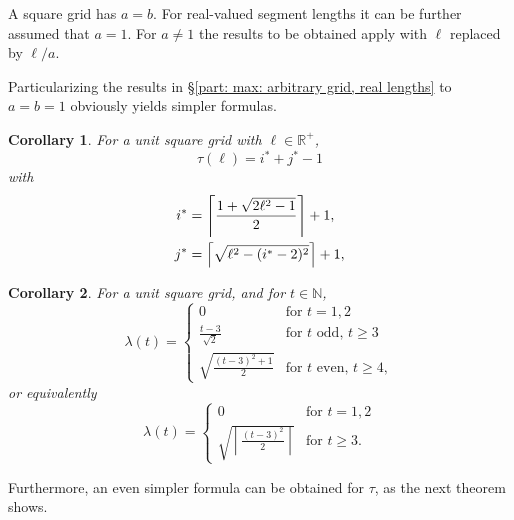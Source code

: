 \documentclass[12pt, a4paper]{article}
\let\Re\relax %
\DeclareMathOperator{\Re}{Re} %
\newcommand{\funt}{\tau} %
\newcommand{\funl}{\lambda} %
\newcommand{\len}{\ell} %
\newcommand{\tiles}{t} %
\newcommand{\isoli}{i^\ast}
\newcommand{\jsoli}{j^\ast}
\newtheorem{corollary}{Corollary}%
\begin{document}
A square grid has $a=b$. For real-valued segment lengths it can be further assumed that $a=1$. For $a \neq 1$ the results to be obtained apply with $\len$ replaced by $\len/a$.

Particularizing the results in \S\ref{part: max: arbitrary grid, real lengths} to $a=b=1$ obviously yields simpler formulas.

\begin{corollary}
\label{cor: funt, sq, form}
For a unit square grid with $\len \in \mathbb R^+$,
\begin{equation}
\label{eq: cor: funt, sq, form}
\funt(\len) = \isoli+\jsoli-1
\end{equation}
with
\begin{align}
\label{eq: cor: funt, sq, form; i}
\isoli &= \left\lceil \frac{1 + \Re \sqrt{2\len^2-1}}{2} \right\rceil + 1, \\
\label{eq: cor: funt, sq, form; j}
\jsoli &= \left\lceil \sqrt{\len^2-(\isoli-2)^2} \right\rceil + 1,
\end{align}
\end{corollary}

\begin{corollary}
\label{theo: funl, sq, form}
For a unit square grid, and for $\tiles \in \mathbb N$,
\begin{equation}
\funl(\tiles) = \begin{cases}
\displaystyle
0 & \text{for } \tiles =1, 2 \\[1.4mm]
\displaystyle
\frac{\tiles-3}{\sqrt{2}} & \text{for } \tiles \text{ odd, } \tiles \geq 3 \\[4.5mm]
\displaystyle
\sqrt{\frac{(\tiles-3)^2+1} {2}} & \text{for } \tiles \text{ even, } \tiles \geq 4,
\end{cases}
\end{equation}
or equivalently
\begin{equation}
\label{eq: theo: funt, sq, form; funl}
\funl(\tiles) = \begin{cases}
\displaystyle
0 & \text{for } \tiles =1, 2 \\[1.4mm]
\displaystyle
\sqrt{\left\lceil \frac{(\tiles-3)^2} {2} \right\rceil} & \text{for } \tiles \geq 3.
\end{cases}
\end{equation}
\end{corollary}

Furthermore, an even simpler formula can be obtained for $\funt$, as the next theorem shows.
\end{document}
